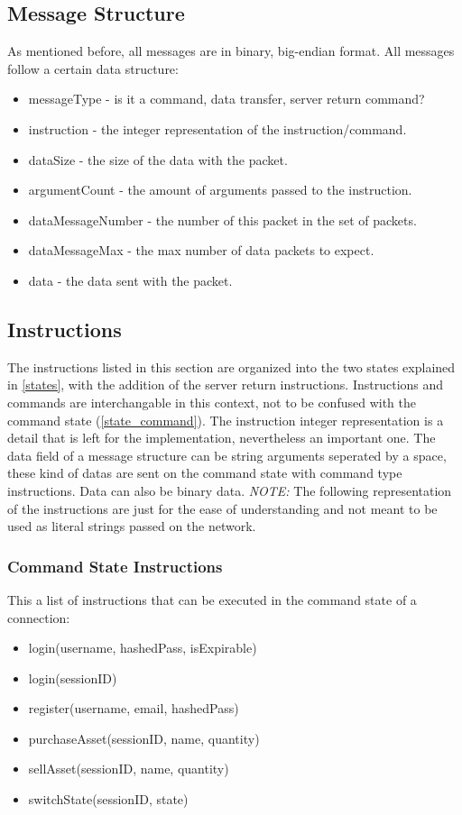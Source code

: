 \documentclass[a4paper]{article}
\begin{document}
\subsection{Message Structure}
\label{protocol_message}
As mentioned before, all messages are in binary, big-endian format. All
messages follow a certain data structure:
\begin{itemize}
	\item messageType - is it a command, data transfer, server return command?
	\item instruction - the integer representation of the instruction/command.
	\item dataSize - the size of the data with the packet.
	\item argumentCount - the amount of arguments passed to the instruction.
	\item dataMessageNumber - the number of this packet in the set of packets.
	\item dataMessageMax - the max number of data packets to expect.
	\item data - the data sent with the packet.
\end{itemize}

\subsection{Instructions}
\label{protocol_instructions}
The instructions listed in this section are organized into the two states 
explained in \ref{states}, with the addition of the server return instructions.
Instructions and commands are interchangable in this context, not to be 
confused with the command state (\ref{state_command}). The instruction integer 
representation is a detail that is left for the implementation, nevertheless an
important one. The data field of a message structure can be string arguments 
seperated by a space, these kind of datas are sent on the command state with 
command type instructions. Data can also be binary data. \emph{NOTE:} The 
following representation of the instructions are just for the ease of 
understanding and not meant to be used as literal strings passed on the 
network.

\subsubsection{Command State Instructions}
\label{protocol_commandstate_inst}
This a list of instructions that can be executed in the command state of a
connection:
\begin{itemize}
	\item login(username, hashedPass, isExpirable)
	\item login(sessionID)
	\item register(username, email, hashedPass)
	\item purchaseAsset(sessionID, name, quantity)
	\item sellAsset(sessionID, name, quantity)
	\item switchState(sessionID, state)
\end{itemize}
\end{document}
